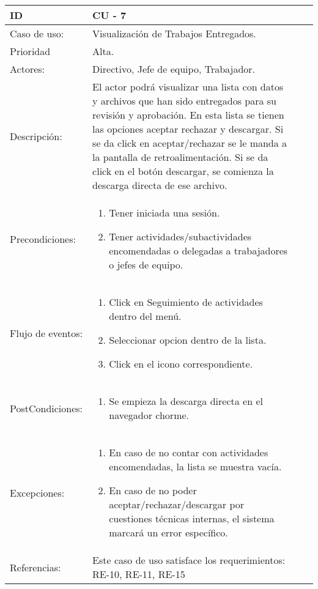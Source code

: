 \documentclass[11pt,a4paper]{article}
\begin{document}
\begin{tabular}[c]{|p{3cm}|p{13cm}|p{2.5cm}|p{3cm}|}
\hline 
\rule[-1ex]{0pt}{2.5ex} ID & CU - 7 \\ 
\hline 
\rule[-1ex]{0pt}{2.5ex} Caso de uso: & Visualización de Trabajos Entregados.\\ 
\hline 
\rule[-1ex]{0pt}{2.5ex} Prioridad & Alta. \\ 
\hline 
\rule[-1ex]{0pt}{2.5ex} Actores: & Directivo, Jefe de equipo, Trabajador.\\ 
\hline 
\rule[-1ex]{0pt}{2.5ex} Descripción: & El actor podrá visualizar una lista con datos y archivos que han sido
entregados para su revisión y aprobación. En esta lista se tienen las opciones aceptar rechazar y descargar. Si se
da click en aceptar/rechazar se le manda a la pantalla de retroalimentación. Si se da click en el botón descargar, se comienza la descarga directa de ese archivo. \\ 
\hline 
\rule[-1ex]{0pt}{2.5ex}Precondiciones: & \begin{enumerate}
\item Tener iniciada una sesión.
\item Tener actividades/subactividades encomendadas o delegadas a trabajadores o jefes de equipo.
\end{enumerate} \\ 
\hline 
\rule[-1ex]{0pt}{2.5ex} Flujo de eventos: & \begin{enumerate} 
\item Click en Seguimiento de actividades dentro del menú.
\item Seleccionar opcion dentro de la lista.
\item Click en el icono correspondiente.
\end{enumerate}
\\ 
\hline 
\rule[-1ex]{0pt}{2.5ex} PostCondiciones:& \begin{enumerate}  
\item Se empieza la descarga directa en el navegador chorme.
\end{enumerate} \\ 
\hline 
\rule[-1ex]{0pt}{2.5ex} Excepciones: & \begin{enumerate} 
\item En caso de no contar con actividades encomendadas, la lista se muestra vacía.
\item En caso de no poder aceptar/rechazar/descargar por cuestiones técnicas internas, el sistema marcará un error específico.
\end{enumerate} \\ 
\hline 
\rule[-1ex]{0pt}{2.5ex} Referencias: & Este caso de uso satisface los requerimientos: RE-10, RE-11, RE-15\\
\hline 

\end{tabular} 
\end{document}
